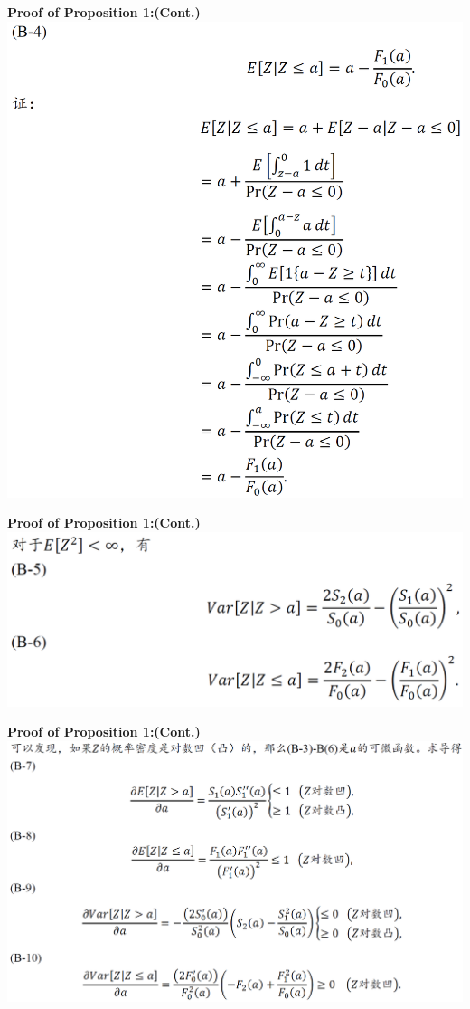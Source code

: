 \documentclass{beamer}
\begin{document}
\begin{frame}
	\textbf{Proof of Proposition 1:(Cont.)}
	\includegraphics[scale=0.47]{proposition1_7}
\end{frame}
\begin{frame}
	\textbf{Proof of Proposition 1:(Cont.)}
	\includegraphics[scale=0.5]{proposition1_8}
\end{frame}
\begin{frame}
	\textbf{Proof of Proposition 1:(Cont.)}
	\includegraphics[scale=0.5]{proposition1_9}
\end{frame}
\end{document}
